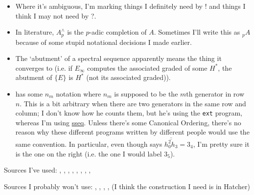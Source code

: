 \documentclass{MetricNotes2023}
\DeclareMathOperator{\colim}{colim}
\begin{document}
\begin{itemize}
\item Where it's ambiguous, I'm marking things I definitely need by ! and things I think I may not need by ?.


\item In literature, \(A^\wedge_p\) is the \(p\)-adic completion of \(A\). Sometimes I'll write this as \(\text{}_pA\) because of some stupid notational decisions I made earlier.

\item The `abutment' of a spectral sequence apparently means the thing it converges to (i.e. if \(E_\infty\) computes the associated graded of some \(H^*\), the abutment of \(\{E\}\) is \(H^*\) (not its associated graded)). 

\item \autocite{rognes2} has some \(n_m\) notation where \(n_m\) is supposed to be the \(m\)th generator in row \(n\). This is a bit arbitrary when there are two generators in the same row and column; I don't know how he counts them, but he's using the \verb|ext| program, whereas I'm using \href{https://spectralsequences.github.io/sseq/}{sseq}. Unless there's some Canonical Ordering, there's no reason why these different programs written by different people would use the same convention. In particular, even though \autocite{rognes2} says \(\overline{\overline{h_0^2h_3}}=3_4\), I'm pretty sure it is the one on the right (i.e. the one I would label \(3_5\)). 
\end{itemize}

Sources I've used: \autocite{cobordism}, 
\autocite{ass}, \autocite{spectra}, \autocite{hatcher5}, \autocite{hatcher}, \autocite{rognes2}, \autocite{concise}, \autocite{spectral_sequences}, \autocite{weibel}

Sources I probably won't use: \autocite{suspension}, \autocite{stable_homotopy}, \autocite{foundations}, \autocite{primer}, \autocite{mazelgee} (I think the construction I need is in Hatcher)

\printbibliography
\end{document}
